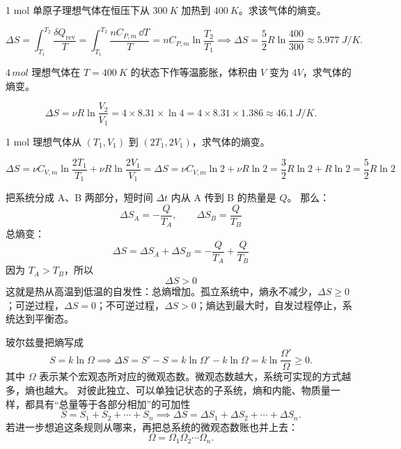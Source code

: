 \begin{exercise}[等压升温的熵变]
1 mol 单原子理想气体在恒压下从 \(\SI{300}{K}\) 加热到 \(\SI{400}{K}\)。求该气体的熵变。
\end{exercise}

\begin{solution}
\[\Delta S=\int_{T_1}^{T_2}\frac{\delta Q_{\mathrm{rev}}}{T} =\int_{T_1}^{T_2}\frac{nC_{P,m}\,\dd T}{T} =nC_{P,m}\ln\frac{T_2}{T_1} \implies \Delta S=\frac{5}{2}R\ln\frac{400}{300}\approx \SI{5.977}{J/K}.\]
\end{solution}

\begin{exercise}
\(4\,\si{mol}\) 理想气体在 \(T=\SI{400}{K}\) 的状态下作等温膨胀，体积由 \(V\) 变为 \(4V\)，求气体的熵变。
\end{exercise}

\begin{solution}
 \[\Delta S =\nu R\ln\frac{V_2}{V_1}=4\times 8.31\times \ln4 =4\times 8.31\times 1.386 \approx \SI{46.1}{J/K}.\]
\end{solution}

\begin{exercise}
    1 mol 理想气体从 \((T_1,V_1)\) 到 \((2T_1,2V_1)\)，求气体的熵变。
\end{exercise}
\begin{solution}
\[
\Delta S=\nu C_{V,m}\ln\frac{2T_1}{T_1}+\nu R\ln\frac{2V_1}{V_1}=\Delta S=\nu C_{V,m}\ln 2+\nu R\ln 2=\frac32R\ln2+R\ln2=\frac52R\ln2
\]
\end{solution}

\begin{theorem}
把系统分成 A、B 两部分，短时间 \(\Delta t\) 内从 A 传到 B 的热量是 \(Q\)。
那么：\[
\Delta S_A=-\frac{Q}{T_A},\qquad
\Delta S_B=\frac{Q}{T_B}
\]
总熵变：\[
\Delta S=\Delta S_A+\Delta S_B
=-\frac{Q}{T_A}+\frac{Q}{T_B}
\]
因为 \(T_A>T_B\)，所以\[
\Delta S>0
\]
这就是热从高温到低温的自发性：总熵增加。孤立系统中，熵永不减少，\(\Delta S\ge 0\)；可逆过程，\(\Delta S=0\)；不可逆过程，\(\Delta S>0\)；熵达到最大时，自发过程停止，系统达到平衡态。
\end{theorem}

\begin{definition}
    玻尔兹曼把熵写成
 \[S=k\ln\Omega \implies \Delta S=S'-S=k\ln\Omega'-k\ln\Omega =k\ln\frac{\Omega'}{\Omega}\ge 0.\]
其中 \(\Omega\) 表示某个宏观态所对应的微观态数。微观态数越大，系统可实现的方式越多，熵也越大。
对彼此独立、可以单独记状态的子系统，熵和内能、物质量一样，都具有“总量等于各部分相加”的可加性
 \[S=S_1+S_2+\cdots+S_n \implies \Delta S=\Delta S_1+\Delta S_2+\cdots+\Delta S_n.\]
若进一步想追这条规则从哪来，再把总系统的微观态数账也并上去：
 \[\Omega=\Omega_1\Omega_2\cdots\Omega_n.\]
\end{definition}


